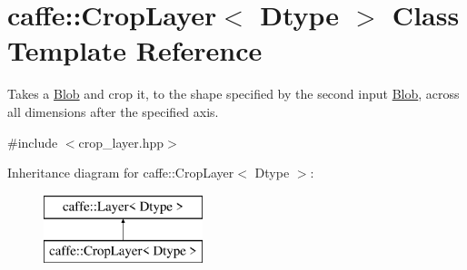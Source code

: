 \hypertarget{classcaffe_1_1CropLayer}{}\section{caffe\+:\+:Crop\+Layer$<$ Dtype $>$ Class Template Reference}
\label{classcaffe_1_1CropLayer}


Takes a \hyperlink{classcaffe_1_1Blob}{Blob} and crop it, to the shape specified by the second input \hyperlink{classcaffe_1_1Blob}{Blob}, across all dimensions after the specified axis.  




{\ttfamily \#include $<$crop\+\_\+layer.\+hpp$>$}

Inheritance diagram for caffe\+:\+:Crop\+Layer$<$ Dtype $>$\+:\begin{figure}[H]
\begin{center}
\leavevmode
\includegraphics[height=2.000000cm]{classcaffe_1_1CropLayer}
\end{center}
\end{figure}
